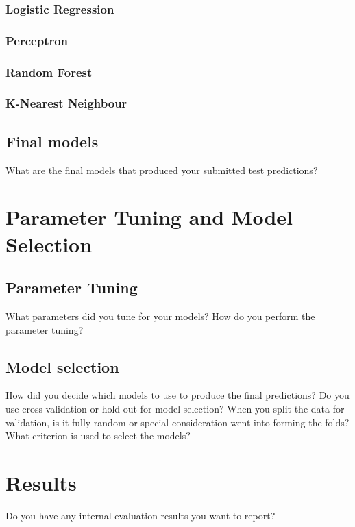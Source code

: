 \documentclass[11pt,a4paper]{article}
\begin{document}
\subsubsection{Logistic Regression}


\subsubsection{Perceptron}


\subsubsection{Random Forest}


\subsubsection{K-Nearest Neighbour}


\subsection{Final models}
What are the final models that produced your submitted test predictions?


\section{Parameter Tuning and Model Selection }

\subsection{Parameter Tuning}
What parameters did you tune for your models? How do you perform the parameter tuning?

\subsection{Model selection}
How did you decide which models to use to produce the final predictions?  Do you use cross-validation or hold-out for model selection? When you split the data for validation, is it fully random or special consideration went into forming the folds? What criterion is used to select the models?


\section{Results}
Do you have any internal evaluation results you want to report?
\end{document}
